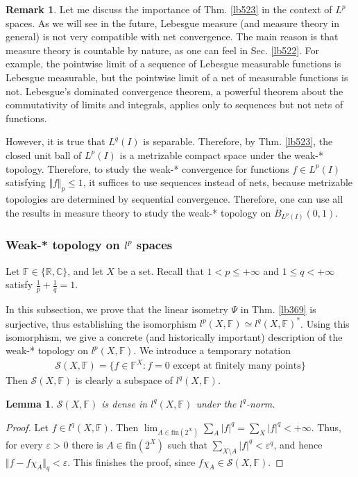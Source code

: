 \documentclass[12pt,b5paper,notitlepage]{article}
\theoremstyle{definition}
\newtheorem{rem}[df]{Remark}
\theoremstyle{plain}
\newtheorem{lm}[df]{Lemma}
\newcommand{\mc}{\mathcal}
\newcommand{\ovl}{\overline}
\newcommand{\Cbb}{\mathbb C}
\newcommand{\Rbb}{\mathbb R}
\newcommand{\fin}{\mathrm{fin}}
\newcommand{\Fbb}{\mathbb F}
\newcommand{\eps}{\varepsilon}
\numberwithin{equation}{section}
\begin{document}
\begin{rem}
Let me discuss the importance of Thm. \ref{lb523} in the context of $L^p$ spaces. As we will see in the future, Lebesgue measure (and measure theory in general) is not very compatible with net convergence. The main reason is that measure theory is countable by nature, as one can feel in Sec. \ref{lb522}. For example, the pointwise limit of a sequence of Lebesgue measurable functions is Lebesgue measurable, but the pointwise limit of a net of measurable functions is not. Lebesgue's dominated convergence theorem, a powerful theorem about the commutativity of limits and integrals, applies only to sequences but not nets of functions. 

However, it is true that $L^q(I)$ is separable. Therefore, by Thm. \ref{lb523}, the closed unit ball of $L^p(I)$ is a metrizable compact space under the weak-* topology. Therefore, to study the weak-* convergence for functions $f\in L^p(I)$ satisfying $\Vert f\Vert_p\leq 1$, it suffices to use sequences instead of nets, because metrizable topologies are determined by sequential convergence. Therefore, one can use all the results in measure theory to study the weak-* topology on $\ovl B_{L^p(I)}(0,1)$.  \hfill\qedsymbol
\end{rem}

\subsubsection{Weak-* topology on $l^p$ spaces}

Let $\Fbb\in\{\Rbb,\Cbb\}$, and let $X$ be a set. Recall that $1<p\leq +\infty$ and $1\leq q<+\infty$ satisfy $\frac 1p+\frac 1q=1$. 

In this subsection, we prove that the linear isometry $\Psi$ in Thm. \ref{lb369} is surjective, thus establishing the isomorphism $l^p(X,\Fbb)\simeq l^q(X,\Fbb)^*$. Using this isomorphism, we give a concrete (and historically important) description of the weak-* topology on $l^p(X,\Fbb)$. We introduce a temporary notation
\begin{align}
\mc S(X,\Fbb)=\{f\in\Fbb^X:f=0\text{ except at finitely many points}\}
\end{align}
Then $\mc S(X,\Fbb)$ is clearly a subspace of $l^q(X,\Fbb)$.


\begin{lm}\label{lb528}
$\mc S(X,\Fbb)$ is dense in $l^q(X,\Fbb)$ under the $l^q$-norm.
\end{lm}

\begin{proof}
Let $f\in l^q(X,\Fbb)$. Then $\lim_{A\in\fin(2^X)}\sum_A|f|^q=\sum_X |f|^q<+\infty$. Thus, for every $\eps>0$ there is $A\in\fin(2^X)$ such that $\sum_{X\setminus A}|f|^q<\eps^q$, and hence $\Vert f-f\chi_A\Vert_q<\eps$. This finishes the proof, since $f\chi_A\in\mc S(X,\Fbb)$.
\end{proof}
\end{document}
